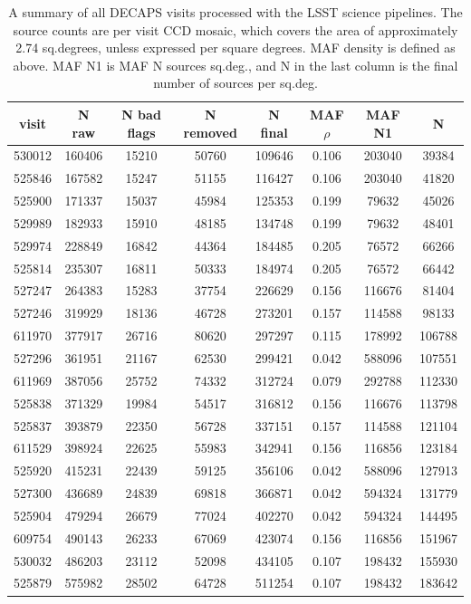 \documentclass[DM,lsstdraft,toc,usenatbib]{lsstdoc}
\begin{document}
\begin{table}
\centering
\caption{A summary of all DECAPS visits processed with the LSST science pipelines. The source counts are per visit CCD mosaic, which covers the area of approximately 2.74 sq.degrees, unless expressed per square degrees. MAF density is defined as above. MAF N1 is MAF N sources sq.deg., and N in the last column is  the final number of sources per   sq.deg.}
\label{tab:lsst_summary}
\begin{tabular}{cccccccc}
visit & N raw & N bad flags & N removed & N final & MAF $\rho$ & MAF N1 & N \\
\hline
530012 & 160406 & 15210 & 50760 & 109646 & 0.106 & 203040 & 39384 \\
525846 & 167582 & 15247 & 51155 & 116427 & 0.106 & 203040 & 41820 \\
525900 & 171337 & 15037 & 45984 & 125353 & 0.199 & 79632 & 45026 \\
529989 & 182933 & 15910 & 48185 & 134748 & 0.199 & 79632 & 48401 \\
529974 & 228849 & 16842 & 44364 & 184485 & 0.205 & 76572 & 66266 \\
525814 & 235307 & 16811 & 50333 & 184974 & 0.205 & 76572 & 66442 \\
527247 & 264383 & 15283 & 37754 & 226629 & 0.156 & 116676 & 81404 \\
527246 & 319929 & 18136 & 46728 & 273201 & 0.157 & 114588 & 98133 \\
611970 & 377917 & 26716 & 80620 & 297297 & 0.115 & 178992 & 106788 \\
527296 & 361951 & 21167 & 62530 & 299421 & 0.042 & 588096 & 107551 \\
611969 & 387056 & 25752 & 74332 & 312724 & 0.079 & 292788 & 112330 \\
525838 & 371329 & 19984 & 54517 & 316812 & 0.156 & 116676 & 113798 \\
525837 & 393879 & 22350 & 56728 & 337151 & 0.157 & 114588 & 121104 \\
611529 & 398924 & 22625 & 55983 & 342941 & 0.156 & 116856 & 123184 \\
525920 & 415231 & 22439 & 59125 & 356106 & 0.042 & 588096 & 127913 \\
527300 & 436689 & 24839 & 69818 & 366871 & 0.042 & 594324 & 131779 \\
525904 & 479294 & 26679 & 77024 & 402270 & 0.042 & 594324 & 144495 \\
609754 & 490143 & 26233 & 67069 & 423074 & 0.156 & 116856 & 151967 \\
530032 & 486203 & 23112 & 52098 & 434105 & 0.107 & 198432 & 155930 \\
525879 & 575982 & 28502 & 64728 & 511254 & 0.107 & 198432 & 183642 \\
\hline
\end{tabular}
\end{table}
\end{document}

